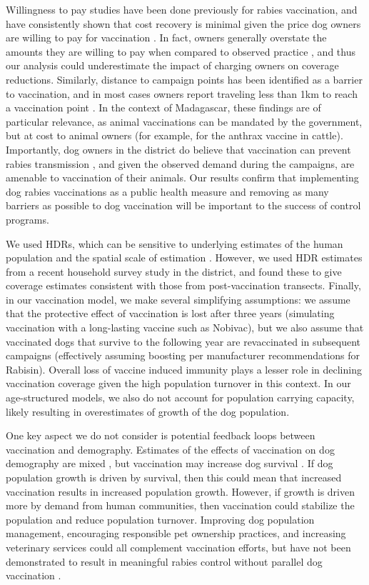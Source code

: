 \documentclass[tropicalmed,article,submit,moreauthors,pdftex]{mdpi}
\begin{document}
Willingness to pay studies have been done previously for rabies
vaccination, and have consistently shown that cost recovery is minimal
given the price dog owners are willing to pay for vaccination
\citep{schildecker2016, durr2008, sambo2014, barbosacosta2020, yoak2021}.
In fact, owners generally overstate the amounts they are willing to pay
when compared to observed practice \citep{birhane2016}, and thus our
analysis could underestimate the impact of charging owners on coverage
reductions. Similarly, distance to campaign points has been identified
as a barrier to vaccination, and in most cases owners report traveling
less than 1km to reach a vaccination point
\citep{mazeri2018barriers, mazeri2019}. In the context of Madagascar,
these findings are of particular relevance, as animal vaccinations can
be mandated by the government, but at cost to animal owners (for
example, for the anthrax vaccine in cattle). Importantly, dog owners in
the district do believe that vaccination can prevent rabies transmission
\citep{leblancclaireRabiesMadagascarThreepronged2019}, and given the
observed demand during the campaigns, are amenable to vaccination of
their animals. Our results confirm that implementing dog rabies
vaccinations as a public health measure and removing as many barriers as
possible to dog vaccination will be important to the success of control
programs.

We used HDRs, which can be sensitive to underlying estimates of the
human population and the spatial scale of estimation
\citep{sambo2018estimating, sambo2017}. However, we used HDR estimates
from a recent household survey study in the district, and found these to
give coverage estimates consistent with those from post-vaccination
transects. Finally, in our vaccination model, we make several
simplifying assumptions: we assume that the protective effect of
vaccination is lost after three years (simulating vaccination with a
long-lasting vaccine such as Nobivac), but we also assume that
vaccinated dogs that survive to the following year are revaccinated in
subsequent campaigns (effectively assuming boosting per manufacturer
recommendations for Rabisin). Overall loss of vaccine induced immunity
plays a lesser role in declining vaccination coverage given the high
population turnover in this context. In our age-structured models, we
also do not account for population carrying capacity, likely resulting
in overestimates of growth of the dog population.

One key aspect we do not consider is potential feedback loops between
vaccination and demography. Estimates of the effects of vaccination on
dog demography are mixed \citep{czupryna2016}, but vaccination may
increase dog survival \citep{conan2015}. If dog population growth is
driven by survival, then this could mean that increased vaccination
results in increased population growth. However, if growth is driven
more by demand from human communities, then vaccination could stabilize
the population and reduce population turnover. Improving dog population
management, encouraging responsible pet ownership practices, and
increasing veterinary services could all complement vaccination efforts,
but have not been demonstrated to result in meaningful rabies control
without parallel dog vaccination \citep{taylor2017}.
\end{document}

